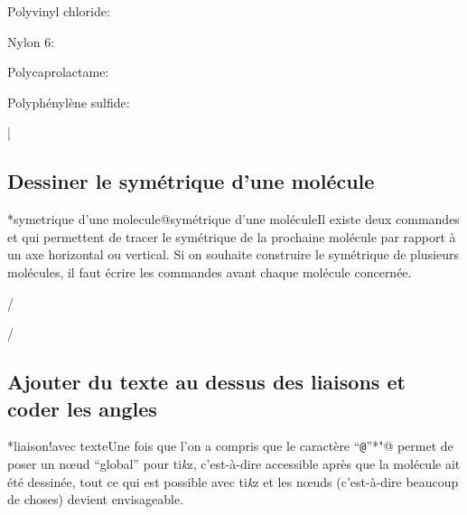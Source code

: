 \documentclass[10pt]{article}
\makeatletter
\newcommand\idx{\@ifstar{\let\print@or@not\@gobble\idx@}{\let\print@or@not\@firstofone\idx@}}
\newcommand\idx@[1]{%
	\ifcat\expandafter\noexpand\@car#1\@nil\relax%
		\expandafter\ifx\@car#1\@nil\protect
			\index{#1}%
			\print@or@not{#1}%
		\else
			\saveexpandmode\expandarg
			\StrSubstitute{\string#1}{\string @}{\@empty\protect\symbol{'100}}[\temp@]%
			\StrGobbleLeft\temp@1[\temp@]%
			\restoreexpandmode
			\expandafter\index\expandafter{\temp@ @\protect\texttt{\protect\textbackslash\temp@}}%
			\print@or@not{\texttt{\string#1}}%
		\fi
	\else
		\index{#1}%
		\print@or@not{#1}%
	\fi
}
\newcommand\make@car@active[1]{%
	\catcode`#1\active
	\begingroup
		\lccode`\~`#1\relax
		\lowercase{\endgroup\def~}%
}
\newif\if@exstar
\newcommand\exemple{%
	\begingroup
	\parskip\z@
	\@makeother\;\@makeother\!\@makeother\?\@makeother\:%
	\@ifstar{\@exstartrue\exemple@}{\@exstarfalse\exemple@}}
\newcommand\exemple@[2][65]{%
	\medbreak\noindent
	\begingroup
		\let\do\@makeother\dospecials
		\make@car@active\ { {}}%
		\make@car@active\^^M{\par\leavevmode}%
		\make@car@active\,{\leavevmode\kern\z@\string,}%
		\make@car@active\-{\leavevmode\kern\z@\string-}%
		\make@car@active\>{\leavevmode\kern\z@\string>}%
		\make@car@active\<{\leavevmode\kern\z@\string<}%
		\exemple@@{#1}{#2}%
}
\newcommand\exemple@@[3]{%
	\def\@tempa##1#3{\exemple@@@{#1}{#2}{##1}}%
	\@tempa
}
\newcommand\exemple@@@[3]{%
	\xdef\the@code{#3}%
	\endgroup
	\if@exstar
		\begingroup
			\fboxrule0.4pt
			\let\breakboxparindent\z@
			\def\bkvz@bottom{\hrule\@height\fboxrule}%
			\let\bkvz@before@breakbox\relax
			\def\bkvz@set@linewidth{\advance\linewidth\dimexpr-2\fboxrule-2\fboxsep}%
			\def\bkvz@left{\vrule\@width\fboxrule\hskip\fboxsep}%
			\def\bkvz@right{\hskip\fboxsep\vrule\@width\fboxrule}%
			\def\bkvz@top{\hbox to \hsize{%
				\vrule\@width\fboxrule\@height\fboxrule
				\leaders\bkvz@bottom\hfill
				\ECFAugie
				\fboxsep\z@
				\colorbox{black}{\kern0.25em\color{white}\footnotesize\lower0.5ex\hbox{\strut#2}\kern0.25em}%
				\leaders\bkvz@bottom\hfill
				\vrule\@width\fboxrule\@height\fboxrule}}%
			\breakbox
				\kern.5ex\relax
				\ttfamily\footnotesize\the@code\par
				\normalfont
				\kern3pt
				\hrule height0.1pt width\linewidth depth0.1pt
				\vskip5pt
				\rightskip0pt plus 1fill
				\everypar{{\color{lightgray}\rlap{\vrule height0.1pt width\linewidth depth0.1pt}}\hskip0pt plus 1fill}%
				\newlinechar`\^^M\everyeof{\noexpand}\scantokens{#3}\par
			\endbreakbox
		\endgroup
	\else
		\vskip0.5ex
		\boxput*(0,1)
			{\fboxsep\z@
			\hbox{\ECFAugie\colorbox{black}{\leavevmode\kern0.25em{\color{white}\footnotesize\strut#2}\kern0.25em}}%
			}%
			{\fboxsep5pt
			\fbox{%
				$\vcenter{\hsize\dimexpr0.#1\linewidth-\fboxsep-\fboxrule\relax
					\kern5pt\parskip0pt \ttfamily\footnotesize\the@code}%
				\vcenter{\kern5pt\hsize\dimexpr\linewidth-0.#1\linewidth-\fboxsep-\fboxrule\relax
					\everypar{{\color{lightgray}\rlap{\vrule height0.1pt width\dimexpr\linewidth-0.#1\linewidth-\fboxsep-\fboxrule depth0.1pt}}}%
					\footnotesize\newlinechar`\^^M\everyeof{\noexpand}\scantokens{#3}}$%
				}%
			}%
	\fi
	\medbreak
	\endgroup
}
\let\do\@makeother\dospecials
\newcommand\TIKZ{ti\textit kz\xspace}
\makeatother
\begin{document}
Polyvinyl chloride:
\bigskip

Nylon 6:
\bigskip

Polycaprolactame:\setatomsep{2em}
\bigskip

\setpolymerdelim[]
Polyphénylène sulfide:
\bigskip

|

\subsection{Dessiner le symétrique d'une molécule}\label{retournement}
\idx*{symetrique d'une molecule@symétrique d'une molécule}Il existe deux commandes \idx{\hflipnext} et \idx{\vflipnext} qui permettent de tracer le symétrique de la prochaine molécule par rapport à un axe horizontal ou vertical. Si on souhaite construire le symétrique de plusieurs molécules, il faut écrire les commandes avant chaque molécule concernée.

\exemple{Symétriques}/%

\vflipnext%
\medskip

\hflipnext%
/

\subsection{Ajouter du texte au dessus des liaisons et coder les angles}
\idx*{liaison!avec texte}Une fois que l'on a compris que le caractère ``\verb-@-''\idx*{"@} permet de poser un nœud ``global'' pour \TIKZ, c'est-à-dire accessible après que la molécule ait été dessinée, tout ce qui est possible avec \TIKZ et les nœuds (c'est-à-dire beaucoup de choses) devient envisageable.
\end{document}
